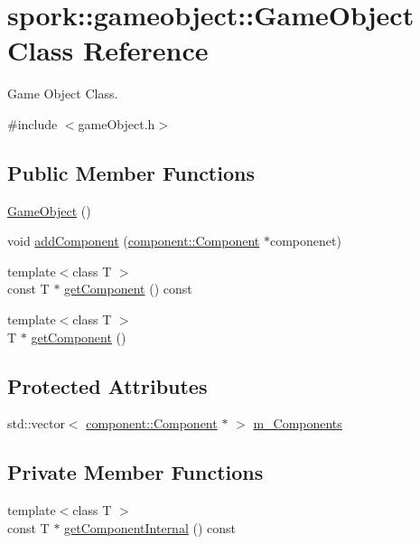 \hypertarget{classspork_1_1gameobject_1_1_game_object}{}\section{spork\+:\+:gameobject\+:\+:Game\+Object Class Reference}
\label{classspork_1_1gameobject_1_1_game_object}


Game Object Class.  




{\ttfamily \#include $<$game\+Object.\+h$>$}

\subsection*{Public Member Functions}
\begin{DoxyCompactItemize}
\item 
\hyperlink{classspork_1_1gameobject_1_1_game_object_a4bbe45cdb98e6052d8ba2a9b39abdef2}{Game\+Object} ()
\item 
void \hyperlink{classspork_1_1gameobject_1_1_game_object_a92c7417aee20ea020fd007f7c388afa7}{add\+Component} (\hyperlink{classspork_1_1gameobject_1_1component_1_1_component}{component\+::\+Component} $\ast$componenet)
\item 
{\footnotesize template$<$class T $>$ }\\const T $\ast$ \hyperlink{classspork_1_1gameobject_1_1_game_object_acc26b9f5ce77820af213aed7fce1aaf3}{get\+Component} () const
\item 
{\footnotesize template$<$class T $>$ }\\T $\ast$ \hyperlink{classspork_1_1gameobject_1_1_game_object_a0ed3f5aa3c450ff53acb3bd730b90b60}{get\+Component} ()
\end{DoxyCompactItemize}
\subsection*{Protected Attributes}
\begin{DoxyCompactItemize}
\item 
std\+::vector$<$ \hyperlink{classspork_1_1gameobject_1_1component_1_1_component}{component\+::\+Component} $\ast$ $>$ \hyperlink{classspork_1_1gameobject_1_1_game_object_a672b7675e3e9d5f0a1a35ad0c315020c}{m\+\_\+\+Components}
\end{DoxyCompactItemize}
\subsection*{Private Member Functions}
\begin{DoxyCompactItemize}
\item 
{\footnotesize template$<$class T $>$ }\\const T $\ast$ \hyperlink{classspork_1_1gameobject_1_1_game_object_a39b2db30001339630f007b4975242f1c}{get\+Component\+Internal} () const
\end{DoxyCompactItemize}


